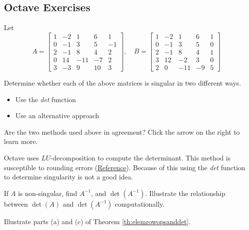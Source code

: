 \documentclass{ximera}
\begin{document}
\subsection*{Octave Exercises}

\begin{problem}\label{prob_oct_det1}
  Let 
  $$A=\begin{bmatrix}1 &-2 & 1 & 6 & 1\\0 & -1 & 3 & 5 & -1\\2 & -1 & 8 & 4 & 2\\0 & 14 & -11 & -7 & 2\\3 & -3 & 9 & 10 & 3\end{bmatrix},\quad B=\begin{bmatrix}1 &-2 & 1 & 6 &1\\0 & -1 & 3 & 5 & 0\\2 & -1 & 8 & 4 & 1\\3 & 12 & -2 & 3 & 0\\2 & 0 & -11 & -9 & 5\end{bmatrix}$$

Determine whether each of the above matrices is singular in two different ways. 
\begin{itemize}
\item Use the \emph{det} function
\item Use an alternative approach
\end{itemize}  
Are the two methods used above in agreement?  Click the arrow on the right to learn more.

\begin{expandable}
Octave uses $LU$-decomposition to compute the determinant.  This method is susceptible to rounding errors (\href{https://www.mathworks.com/help/matlab/ref/det.html}{Reference}).  Because of this using the \emph{det} function to determine singularity is not a good idea.
\end{expandable}

If $A$ is non-singular, find $A^{-1}$, and $\det(A^{-1})$.  Illustrate the relationship between $\det(A)$ and $\det(A^{-1})$ computationally.
  \end{problem}

  \begin{problem}\label{prob_oct_det_prop}
    Illustrate parts (a) and (c) of Theorem \ref{th:elemrowopsanddet}.
  \end{problem}
\end{document}
